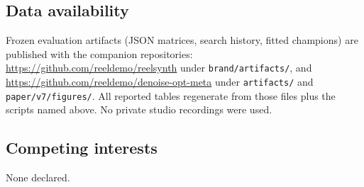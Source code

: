 \subsection{Data availability}
\label{sec:data-availability}
Frozen evaluation artifacts (JSON matrices, search history, fitted champions) are published with the companion repositories:
\url{https://github.com/reeldemo/reelsynth} under \texttt{brand/artifacts/}, and
\url{https://github.com/reeldemo/denoise-opt-meta} under \texttt{artifacts/} and \texttt{paper/v7/figures/}.
All reported tables regenerate from those files plus the scripts named above.
No private studio recordings were used.

\subsection{Competing interests}
\label{sec:competing}
None declared.
